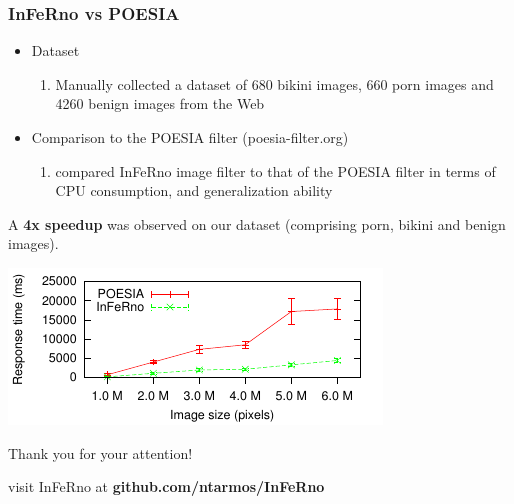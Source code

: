 \documentclass{beamer}
\begin{document}
\begin{frame}
\frametitle{InFeRno vs POESIA}
	\begin{itemize}
		\item Dataset
			\begin{enumerate}
				\item Manually collected a dataset of 680 bikini images, 660 porn images and 4260 benign images from the Web
			\end{enumerate}

		\item Comparison to the POESIA filter (poesia-filter.org)
			\begin{enumerate}
				\item compared InFeRno image filter to that of the POESIA filter in terms of CPU consumption, and generalization ability
			\end{enumerate}
	\end{itemize}
	
	\begin{block}
	{}
	A \textbf{4x speedup} was observed on our dataset (comprising porn, bikini and benign images).
	\end{block}

	\begin{center}
		\includegraphics[scale=1.3]{images/scatter-p-t-all-bars.pdf}
	\end{center}

\end{frame}

\begin{frame}
	\centerline{Thank you for your attention! \smiley}
	\centerline{}
	\centerline{\small{visit InFeRno at \bf{github.com/ntarmos/InFeRno}}}
\end{frame}
\end{document}
